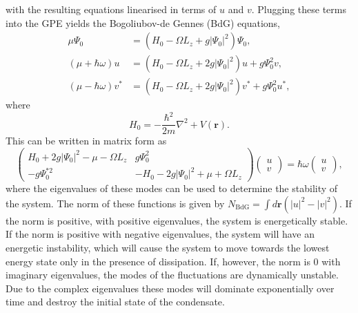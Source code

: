 with the resulting equations linearised in terms of $u$ and $v$. Plugging these terms into the GPE yields the Bogoliubov-de Gennes (BdG) equations,
\begin{subequations}\label{eqn:bogo_lhsrhs}
\begin{align}
    \mu \Psi_0 &= (H_0 - \Omega L_z + g |\Psi_0|^2)\Psi_0,\\
    (\mu +\hbar\omega)u &= (H_0 - \Omega L_z + 2g|\Psi_0|^2)u + g\Psi_0^2 v,\\
    (\mu -\hbar\omega)v^{*} &= (H_0 - \Omega L_z + 2g|\Psi_0|^2)v^{*} + g\Psi_0^2 u^{*},
\end{align}
\end{subequations}
where
\begin{equation}\label{eqn:bogo_h0}
H_0 = -\frac{\hbar^2}{2m}\nabla^2 + V(\mathbf{r}).
\end{equation}
This can be written in matrix form as
\begin{equation}
    \begin{pmatrix}
        H_0 + 2g|\Psi_0|^2- \mu -\Omega L_z & g\Psi_0^2 \\
        -g\Psi_0^{*2} & -H_0 - 2g|\Psi_0|^2 + \mu +\Omega L_z
    \end{pmatrix}
    \begin{pmatrix}
        u \\
        v
    \end{pmatrix}
    = \hbar\omega
    \begin{pmatrix}
        u \\
        v
    \end{pmatrix},
\end{equation}
where the eigenvalues of these modes can be used to determine the stability of the system. The norm of these functions is given by $N_{\textrm{BdG}}=\int d\mathbf{r}(|u|^2 - |v|^2)$. If the norm is positive, with positive eigenvalues, the system is energetically stable. If the norm is positive with negative eigenvalues, the system will have an energetic instability, which will cause the system to move towards the lowest energy state only in the presence of dissipation. If, however, the norm is 0 with imaginary eigenvalues, the modes of the fluctuations are dynamically unstable. Due to the complex eigenvalues these modes will dominate exponentially over time and destroy the initial state of the condensate. %

